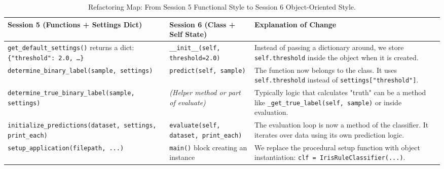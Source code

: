 \begin{landscape}
\begin{table}[H]
\centering
\small
\renewcommand{\arraystretch}{0.3}

\begin{tabular}{|p{}|p{}|p{}|}
\hline
\textbf{Session 5 (Functions + Settings Dict)} & \textbf{Session 6 (Class + Self State)} & \textbf{Explanation of Change} \\
\hline
\texttt{get\_default\_settings()} returns a dict: \texttt{\{"threshold": 2.0, \dots\}} & \texttt{\_\_init\_\_(self, threshold=2.0)} & Instead of passing a dictionary around, we store \texttt{self.threshold} inside the object when it is created. \\
\hline
\texttt{determine\_binary\_label(sample, settings)} & \texttt{predict(self, sample)} & The function now belongs to the class. It uses \texttt{self.threshold} instead of \texttt{settings["threshold"]}. \\
\hline
\texttt{determine\_true\_binary\_label(sample, settings)} & \textit{(Helper method or part of evaluate)} & Typically logic that calculates "truth" can be a method like \texttt{\_get\_true\_label(self, sample)} or inside evaluation. \\
\hline
\texttt{initialize\_predictions(dataset, settings, print\_each)} & \texttt{evaluate(self, dataset, print\_each)} & The evaluation loop is now a method of the classifier. It iterates over data using its own prediction logic. \\
\hline
\texttt{setup\_application(filepath, ...)} & \texttt{main()} block creating an instance & We replace the procedural setup function with object instantiation: \texttt{clf = IrisRuleClassifier(...)}. \\
\hline
\end{tabular}
\caption{Refactoring Map: From Session 5 Functional Style to Session 6 Object-Oriented Style.}
\end{table}
\end{landscape}
